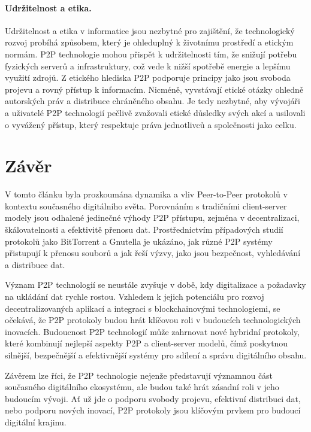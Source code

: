 \documentclass[10pt,twoside,czech,a4paper]{article}
\begin{document}
\paragraph{Udržitelnost a etika.}

Udržitelnost a etika v informatice jsou nezbytné pro zajištění, že technologický rozvoj probíhá způsobem, který je ohleduplný k životnímu prostředí a etickým normám.
P2P technologie mohou přispět k udržitelnosti tím, že snižují potřebu fyzických serverů a infrastruktury, což vede k nižší spotřebě energie a lepšímu využití zdrojů.
Z etického hlediska P2P podporuje principy jako jsou svoboda projevu a rovný přístup k informacím.
Nicméně, vyvstávají etické otázky ohledně autorských práv a distribuce chráněného obsahu.
Je tedy nezbytné, aby vývojáři a uživatelé P2P technologií pečlivě zvažovali etické důsledky svých akcí a usilovali o vyvážený přístup, který respektuje práva jednotlivců a společnosti jako celku.


\section{Závěr}

V tomto článku byla prozkoumána dynamika a vliv Peer-to-Peer protokolů v kontextu současného digitálního světa.
Porovnáním s tradičními client-server modely jsou odhalené jedinečné výhody P2P přístupu, zejména v decentralizaci, škálovatelnosti a efektivitě přenosu dat.
Prostřednictvím případových studií protokolů jako BitTorrent a Gnutella je ukázáno, jak různé P2P systémy přistupují k přenosu souborů a jak řeší výzvy, jako jsou bezpečnost, vyhledávání a distribuce dat.

Význam P2P technologií se neustále zvyšuje v době, kdy digitalizace a požadavky na ukládání dat rychle rostou.
Vzhledem k jejich potenciálu pro rozvoj decentralizovaných aplikací a integraci s blockchainovými technologiemi, se očekává, že P2P protokoly budou hrát klíčovou roli v budoucích technologických inovacích.
Budoucnost P2P technologií může zahrnovat nové hybridní protokoly, které kombinují nejlepší aspekty P2P a client-server modelů, čímž poskytnou silnější, bezpečnější a efektivnější systémy pro sdílení a správu digitálního obsahu.

Závěrem lze říci, že P2P technologie nejenže představují významnou část současného digitálního ekosystému, ale budou také hrát zásadní roli v jeho budoucím vývoji.
Ať už jde o podporu svobody projevu, efektivní distribuci dat, nebo podporu nových inovací, P2P protokoly jsou klíčovým prvkem pro budoucí digitální krajinu.




\end{document}

